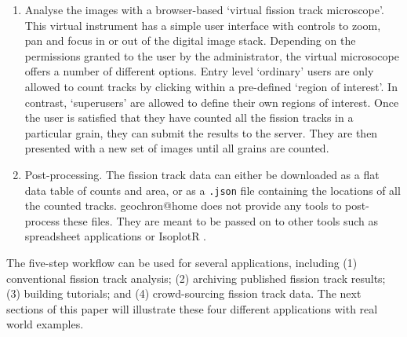 \documentclass[gchron, manuscript]{copernicus}
\begin{document}
\begin{enumerate}
\item Analyse the images with a browser-based `virtual fission track
  microscope'. This virtual instrument has a simple user interface
  with controls to zoom, pan and focus in or out of the digital image
  stack. Depending on the permissions granted to the user by the
  administrator, the virtual microsocope offers a number of different
  options.  Entry level `ordinary' users are only allowed to count
  tracks by clicking within a pre-defined `region of interest'. In
  contrast, `superusers' are allowed to define their own regions of
  interest. Once the user is satisfied that they have counted all the
  fission tracks in a particular grain, they can submit the results to
  the server. They are then presented with a new set of images until
  all grains are counted.

\item Post-processing. The fission track data can either be downloaded
  as a flat data table of counts and area, or as a \texttt{.json} file
  containing the locations of all the counted tracks. geochron@home
  does not provide any tools to post-process these files. They are
  meant to be passed on to other tools such as spreadsheet
  applications or IsoplotR \citep{vermeesch2018c}.
  
\end{enumerate}
  
The five-step workflow can be used for several applications, including
(1) conventional fission track analysis; (2) archiving published
fission track results; (3) building tutorials; and (4) crowd-sourcing
fission track data. The next sections of this paper will illustrate
these four different applications with real world examples.\medskip
\end{document}
